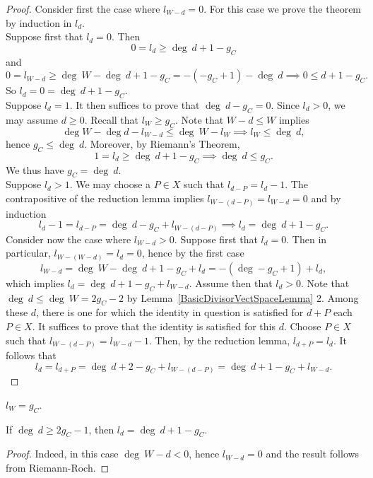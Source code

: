     \begin{proof}
        Consider first the case where $l_{W-d} = 0$. For this case we prove the theorem by induction in $l_d$.\\ Suppose first that $l_d=0$. Then 
        $$
            0 =l_{d} \geq \deg \ d + 1 - g_C
        $$
        and 
        $$
            0 = l_{W-d} \geq \deg \ W -\deg \ d + 1 -g_C = -(-g_C+1)-\deg \ d \implies 0\leq d+1 -g_C.
        $$ 
        So $l_d = 0 = \deg \ d + 1 - g_C.$\\
        Suppose $l_d = 1$. It then suffices to prove that $\deg \ d -g_C =0$. Since $l_d>0$, we may assume $d\geq 0$. Recall that $l_W \geq g_C$. Note that $W-d \leq W$ implies 
        $$
            \deg W-\deg d -l_{W-d} \leq \deg \ W - l_W \implies l_W \leq \deg \ d,
        $$ 
        hence $g_C\leq \deg \ d$.
        Moreover, by Riemann's Theorem, 
        $$
            1 = l_d \geq \deg \ d + 1 -g_C \implies \deg \ d \leq g_C.
        $$ 
        We thus have $g_C = \deg \ d$.\\
        Suppose $l_d> 1$. We may choose a $P\in X$ such that $l_{d-P}=l_d-1$. The contrapositive of the reduction lemma implies $l_{W-(d-P)} = l_{W-d} = 0$ and by induction 
        $$
            l_d-1=l_{d-P} = \deg \ d -g_C+l_{W-(d-P)} \implies l_d = \deg \ d +1-g_C. 
        $$
        Consider now the case where $l_{W-d}>0$. Suppose first that $l_d=0$. Then in particular, $l_{W-(W-d)} = l_d = 0$, hence by the first case 
        $$
            l_{W-d} = \deg \ W-\deg \ d +1 - g_C+l_{d} = -(\deg-g_C+1)+l_d,
        $$
        which implies $l_d = \deg \ d +1 -g_C+l_{W-d}$. Assume then that $l_d>0$. Note that $\deg \ d \leq \deg \ W = 2g_C -2$ by Lemma~\ref{BasicDivisorVectSpaceLemma} 2. Among these $d$, there is one for which the identity in question is satisfied for $d+P$ each $P\in X$. It suffices to prove that the identity is satisfied for this $d$. Choose $P\in X$ such that $l_{W-(d-P)} = l_{W-d}-1$. Then, by the reduction lemma, $l_{d+P} = l_d$. It follows that 
        $$
            l_{d} = l_{d+P} = \deg \ d +2 -g_C+l_{W-(d-P)} = \deg \ d +1 -g_C + l_{W-d}.
        $$
    \end{proof}
    \begin{corollary}
        $l_W = g_C$. 
    \end{corollary}
    \begin{corollary}
        If $\deg \ d \geq 2g_C -1$, then $l_d = \deg \ d +1 -g_C$. 
    \end{corollary}
    \begin{proof}
        Indeed, in this case $\deg \ W-d <0$, hence $l_{W-d} = 0$ and the result follows from Riemann-Roch.
    \end{proof}

